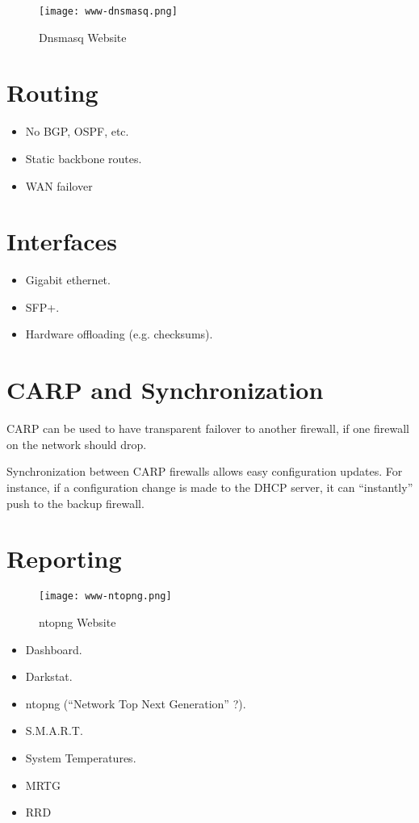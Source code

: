 \begin{figure}[h!]
\begin{center}
\texttt{[image: www-dnsmasq.png]}
 \caption{Dnsmasq Website}
 \label{fig:www-dnsmasq}
\end{center}
\end{figure}



\section{Routing}
\begin{itemize}
 \item No BGP, OSPF, etc.
 \item Static backbone routes.
 \item WAN failover
\end{itemize}


\section{Interfaces}

\begin{itemize}
 \item Gigabit ethernet.
 \item SFP+.
 \item Hardware offloading (e.g. checksums).
\end{itemize}


\section{CARP and Synchronization}
CARP can be used to have transparent failover to another firewall, if one
firewall on the network should drop.

Synchronization between CARP firewalls allows easy configuration updates. For
instance, if a configuration change is made to the DHCP server, it can
``instantly'' push to the backup firewall.


\section{Reporting}

\begin{figure}[h!]
\begin{center}
\texttt{[image: www-ntopng.png]}
 \caption{ntopng Website}
 \label{fig:www-ntopng}
\end{center}
\end{figure}

\begin{itemize}
 \item Dashboard.
 \item Darkstat.
 \item ntopng (``Network Top Next Generation'' ?).
 \item S.M.A.R.T.
 \item System Temperatures.
 \item MRTG
 \item RRD
\end{itemize}


